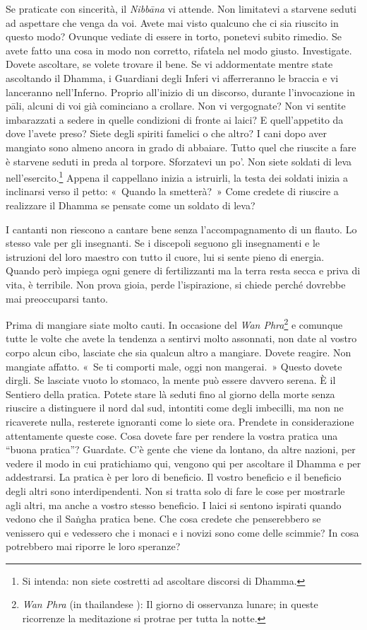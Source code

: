 Se praticate con sincerità, il \emph{Nibbāna} vi attende. Non limitatevi
a starvene seduti ad aspettare che venga da voi. Avete mai visto
qualcuno che ci sia riuscito in questo modo? Ovunque vediate di essere
in torto, ponetevi subito rimedio. Se avete fatto una cosa in modo non
corretto, rifatela nel modo giusto. Investigate. Dovete ascoltare, se
volete trovare il bene. Se vi addormentate mentre state ascoltando il
Dhamma, i Guardiani degli Inferi vi afferreranno le braccia e vi
lanceranno nell'Inferno. Proprio all'inizio di un discorso, durante
l'invocazione in pāli, alcuni di voi già cominciano a crollare. Non vi
vergognate? Non vi sentite imbarazzati a sedere in quelle condizioni di
fronte ai laici? E quell'appetito da dove l'avete preso? Siete degli
spiriti famelici o che altro? I cani dopo aver mangiato sono almeno
ancora in grado di abbaiare. Tutto quel che riuscite a fare è starvene
seduti in preda al torpore. Sforzatevi un po'. Non siete soldati di leva
nell'esercito.\footnote{Si intenda: non siete costretti ad ascoltare
  discorsi di Dhamma.} Appena il cappellano inizia a istruirli, la testa
dei soldati inizia a inclinarsi verso il petto: «~Quando la smetterà?~»
Come credete di riuscire a realizzare il Dhamma se pensate come un
soldato di leva?

I cantanti non riescono a cantare bene senza l'accompagnamento di un
flauto. Lo stesso vale per gli insegnanti. Se i discepoli seguono gli
insegnamenti e le istruzioni del loro maestro con tutto il cuore, lui si
sente pieno di energia. Quando però impiega ogni genere di fertilizzanti
ma la terra resta secca e priva di vita, è terribile. Non prova gioia,
perde l'ispirazione, si chiede perché dovrebbe mai preoccuparsi tanto.

Prima di mangiare siate molto cauti. In occasione del \emph{Wan
Phra}\footnote{\emph{Wan Phra} (in thailandese ): Il giorno di
  osservanza lunare; in queste ricorrenze la meditazione si protrae per
  tutta la notte.} e comunque tutte le volte che avete la tendenza a
sentirvi molto assonnati, non date al vostro corpo alcun cibo, lasciate
che sia qualcun altro a mangiare. Dovete reagire. Non mangiate affatto.
«~Se ti comporti male, oggi non mangerai.~» Questo dovete dirgli. Se
lasciate vuoto lo stomaco, la mente può essere davvero serena. È il
Sentiero della pratica. Potete stare là seduti fino al giorno della
morte senza riuscire a distinguere il nord dal sud, intontiti come degli
imbecilli, ma non ne ricaverete nulla, resterete ignoranti come lo siete
ora. Prendete in considerazione attentamente queste cose. Cosa dovete
fare per rendere la vostra pratica una ``buona pratica''? Guardate. C'è
gente che viene da lontano, da altre nazioni, per vedere il modo in cui
pratichiamo qui, vengono qui per ascoltare il Dhamma e per addestrarsi.
La pratica è per loro di beneficio. Il vostro beneficio e il beneficio
degli altri sono interdipendenti. Non si tratta solo di fare le cose per
mostrarle agli altri, ma anche a vostro stesso beneficio. I laici si
sentono ispirati quando vedono che il Saṅgha pratica bene. Che cosa
credete che penserebbero se venissero qui e vedessero che i monaci e i
novizi sono come delle scimmie? In cosa potrebbero mai riporre le loro
speranze?

